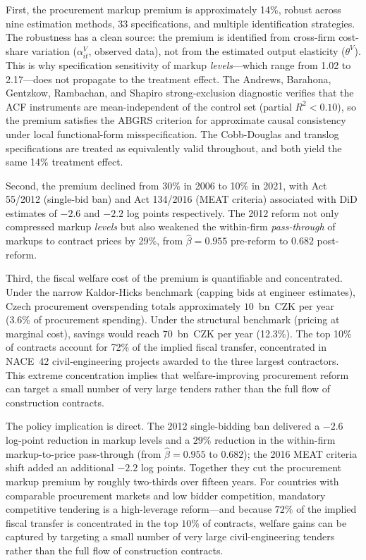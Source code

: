 \documentclass[11pt]{article}
\begin{document}
First, the procurement markup premium is approximately 14\%, robust across nine estimation methods, 33 specifications, and multiple identification strategies. The robustness has a clean source: the premium is identified from cross-firm cost-share variation ($\alpha^V_{it}$, observed data), not from the estimated output elasticity ($\theta^V$). This is why specification sensitivity of markup \emph{levels}---which range from 1.02 to 2.17---does not propagate to the treatment effect. The Andrews, Barahona, Gentzkow, Rambachan, and Shapiro \cite{ABGRS2025} strong-exclusion diagnostic verifies that the ACF instruments are mean-independent of the control set (partial $R^2 < 0.10$), so the premium satisfies the ABGRS criterion for approximate causal consistency under local functional-form misspecification. The Cobb-Douglas and translog specifications are treated as equivalently valid throughout, and both yield the same 14\% treatment effect.

Second, the premium declined from 30\% in 2006 to 10\% in 2021, with Act 55/2012 (single-bid ban) and Act 134/2016 (MEAT criteria) associated with DiD estimates of $-2.6$ and $-2.2$ log points respectively. The 2012 reform not only compressed markup \emph{levels} but also weakened the within-firm \emph{pass-through} of markups to contract prices by 29\%, from $\hat\beta = 0.955$ pre-reform to $0.682$ post-reform.

Third, the fiscal welfare cost of the premium is quantifiable and concentrated. Under the narrow Kaldor-Hicks benchmark (capping bids at engineer estimates), Czech procurement overspending totals approximately $10$~bn~CZK per year (3.6\% of procurement spending). Under the structural benchmark (pricing at marginal cost), savings would reach $70$~bn~CZK per year (12.3\%). The top 10\% of contracts account for 72\% of the implied fiscal transfer, concentrated in NACE~42 civil-engineering projects awarded to the three largest contractors. This extreme concentration implies that welfare-improving procurement reform can target a small number of very large tenders rather than the full flow of construction contracts.

The policy implication is direct. The 2012 single-bidding ban delivered a $-2.6$ log-point reduction in markup levels and a $29\%$ reduction in the within-firm markup-to-price pass-through (from $\hat\beta = 0.955$ to $0.682$); the 2016 MEAT criteria shift added an additional $-2.2$ log points. Together they cut the procurement markup premium by roughly two-thirds over fifteen years. For countries with comparable procurement markets and low bidder competition, mandatory competitive tendering is a high-leverage reform---and because $72\%$ of the implied fiscal transfer is concentrated in the top $10\%$ of contracts, welfare gains can be captured by targeting a small number of very large civil-engineering tenders rather than the full flow of construction contracts.
\end{document}
